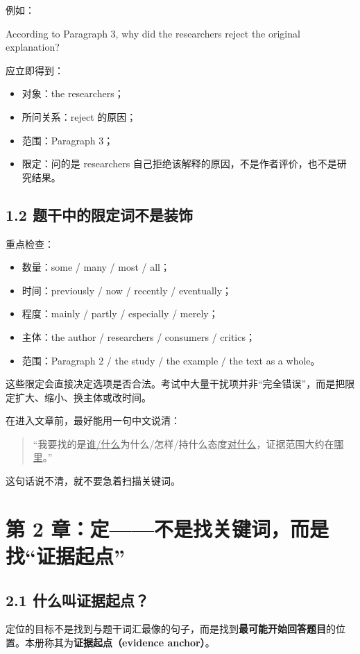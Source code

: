 \documentclass[11pt,a4paper]{ctexart}
\newcommand{\kw}[1]{\textbf{#1}}
\newcommand{\term}[2]{\textbf{#1（#2）}}
\begin{document}
例如：
\begin{eng}[例 1：题干拆解]
According to Paragraph 3, why did the researchers reject the original explanation?
\end{eng}
应立即得到：
\begin{itemize}
  \item 对象：the researchers；
  \item 所问关系：reject 的原因；
  \item 范围：Paragraph 3；
  \item 限定：问的是 researchers 自己拒绝该解释的原因，不是作者评价，也不是研究结果。
\end{itemize}

\subsection{1.2 题干中的限定词不是装饰}
重点检查：
\begin{itemize}
  \item 数量：some / many / most / all；
  \item 时间：previously / now / recently / eventually；
  \item 程度：mainly / partly / especially / merely；
  \item 主体：the author / researchers / consumers / critics；
  \item 范围：Paragraph 2 / the study / the example / the text as a whole。
\end{itemize}
这些限定会直接决定选项是否合法。考试中大量干扰项并非“完全错误”，而是把限定扩大、缩小、换主体或改时间。

\begin{method}[题干压缩句]
在进入文章前，最好能用一句中文说清：
\begin{quote}
“我要找的是\underline{谁/什么}为什么/怎样/持什么态度\underline{对什么}，证据范围大约在\underline{哪里}。”
\end{quote}
这句话说不清，就不要急着扫描关键词。
\end{method}

\section{第 2 章：定——不是找关键词，而是找“证据起点”}

\subsection{2.1 什么叫证据起点？}
定位的目标不是找到与题干词汇最像的句子，而是找到\kw{最可能开始回答题目}的位置。本册称其为\term{证据起点}{evidence anchor}。
\end{document}
